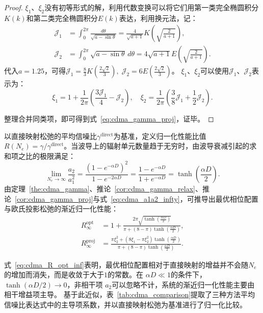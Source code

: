 \begin{proof}
	$\xi_1$、$\xi_2$没有初等形式的解，利用代数变换可以将它们用第一类完全椭圆积分$K(k)$和第二类完全椭圆积分$E(k)$表达，利用换元法，记：
	\begin{align}
		\mathcal{J}_1 &= \int_{0}^{2\pi} \frac{d\theta}{\sqrt{a - \sin\theta}} = \frac{4}{\sqrt{a+1}} K\left(\sqrt{\frac{2}{a+1}}\right),\\
		\mathcal{J}_2 &= \int_{0}^{2\pi} \sqrt{a - \sin\theta} \, d\theta = 4\sqrt{a+1} E\left(\sqrt{\frac{2}{a+1}}\right).
	\end{align}
	代入$a=1.25$，可得$\mathcal{J}_1=\frac{8}{3} K(\frac{2\sqrt{2}}{3}),\;\mathcal{J}_2=6 E(\frac{2\sqrt{2}}{3})$。
	$\xi_1$、$\xi_2$可以使用$\mathcal{J}_1$、$\mathcal{J}_2$表示为：
	\begin{equation}
		\xi_1 = 1 + \frac{1}{2\pi}\left( \frac{3\mathcal{J}_1}{4}-\mathcal{J}_2\right) ,\quad
		\xi_2 = \frac{1}{2\pi}\left(\frac{3}{8}\mathcal{J}_1 +\frac{1}{2}\mathcal{J}_2\right).
	\end{equation}
	
	整理合并同类项，即可得到式~\eqref{eq:cdma_gamma_proj}，证毕。
\end{proof}

以直接映射松弛的平均信噪比$\gamma^{\mathrm{direct}}$为基准，定义归一化性能比值$R(N_e) = \gamma / \gamma^{\mathrm{direct}}$。当波导上的辐射单元数量趋于无穷时，由波导衰减引起的求和项之比的极限满足：
\begin{equation}\label{eq:cdma_a1a2_infty}
	\lim_{N_e \to \infty} \frac{a_2}{a_1^2} = \frac{(1 - e^{-\alpha D})^2}{1 - e^{-2\alpha D}} = \frac{1 - e^{-\alpha D}}{1 + e^{-\alpha D}} = \tanh\left(\frac{\alpha D}{2}\right).
\end{equation}
由定理~\ref{the:cdma_gamma}、推论~\ref{cor:cdma_gamma_relax}、推论~\ref{cor:cdma_gamma_proj}与式~\eqref{eq:cdma_a1a2_infty}，可推导出最优相位配置与欧氏投影松弛的渐近归一化性能：
\begin{align}
	R_{\infty}^{\mathrm{opt}} &= 1 + \frac{2\pi \sqrt{\tanh\left(\frac{\alpha D}{2}\right)}}{\pi + (8-\pi) \tanh\left(\frac{\alpha D}{2}\right)}, \label{eq:cdma_R_opt_inf}\\
	R_{\infty}^{\mathrm{proj}} &= \frac{\pi \xi_2^2 + (8 \xi_1 - \pi \xi_2^2) \tanh\left(\frac{\alpha D}{2}\right)}{\pi + (8-\pi) \tanh\left(\frac{\alpha D}{2}\right)}. \label{eq:cdma_R_proj_inf}
\end{align}

式~\eqref{eq:cdma_R_opt_inf}表明，最优相位配置相对于直接映射的增益并不会随$N_e$的增加而消失，而是收敛于大于$1$的常数。在 $\alpha D \ll 1$的条件下，$\tanh(\alpha D/2) \to 0$，非相干项 $a_2$可以忽略不计，系统的渐近归一化性能主要由相干增益项主导。
基于此近似，表~\ref{tab:cdma_comparison}提取了三种方法平均信噪比表达式中的主导项系数，并以直接映射松弛为基准进行了归一化比较。

